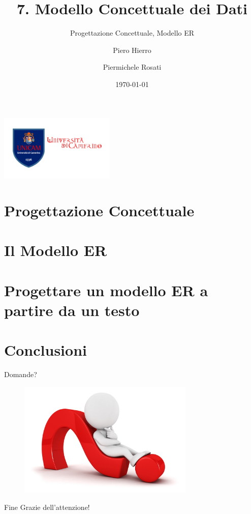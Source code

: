 \documentclass[11pt,aspectratio=169]{beamer}
\author[Piero Hierro \and Piermichele Rosati]{Piero Hierro \and Piermichele Rosati}
\institute[]{\large Universit\`a di Camerino\\ \footnotesize Tutorato - Basi di Dati}
\title[Modello Concettuale dei Dati]{7. Modello Concettuale dei Dati}
\subtitle{Progettazione Concettuale, Modello ER}
\begin{document}
\begin{frame}
\centering
\includegraphics[width=5.5cm]{../img/unicam-logo.jpg}
\date{\today}
\titlepage
\end{frame}


\section{Progettazione Concettuale}

%
\section{Il Modello ER}

%
\section{Progettare un modello ER a partire da un testo}

%
\section{Conclusioni}

\begin{frame}{Domande?}
    \begin{figure}
\centering
    \includegraphics[width=0.75\textwidth]{../img/questions.jpg}
\end{figure}
\end{frame}

\begin{frame}{Fine}
    \centering
    \huge Grazie dell'attenzione!
\end{frame}
\end{document}
